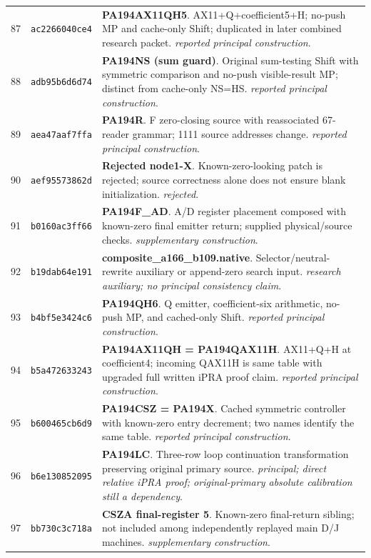 \begin{longtable}{@{}r p{} p{}@{}}
87 & \texttt{ac2266040ce4} & \textbf{PA194AX11QH5}. AX11+Q+coefficient5+H; no-push MP and cache-only Shift; duplicated in later combined research packet. \emph{reported principal construction}.\\[3pt]
88 & \texttt{adb95b6d6d74} & \textbf{PA194NS (sum guard)}. Original sum-testing Shift with symmetric comparison and no-push visible-result MP; distinct from cache-only NS=HS. \emph{reported principal construction}.\\[3pt]
89 & \texttt{aea47aaf7ffa} & \textbf{PA194R}. F zero-closing source with reassociated 67-reader grammar; 1111 source addresses change. \emph{reported principal construction}.\\[3pt]
90 & \texttt{aef95573862d} & \textbf{Rejected node1-X}. Known-zero-looking patch is rejected; source correctness alone does not ensure blank initialization. \emph{rejected}.\\[3pt]
91 & \texttt{b0160ac3ff66} & \textbf{PA194F\_AD}. A/D register placement composed with known-zero final emitter return; supplied physical/source checks. \emph{supplementary construction}.\\[3pt]
92 & \texttt{b19dab64e191} & \textbf{composite\_a166\_b109.native}. Selector/neutral-rewrite auxiliary or append-zero search input. \emph{research auxiliary; no principal consistency claim}.\\[3pt]
93 & \texttt{b4bf5e3424c6} & \textbf{PA194QH6}. Q emitter, coefficient-six arithmetic, no-push MP, and cached-only Shift. \emph{reported principal construction}.\\[3pt]
94 & \texttt{b5a472633243} & \textbf{PA194AX11QH = PA194QAX11H}. AX11+Q+H at coefficient4; incoming QAX11H is same table with upgraded full written iPRA proof claim. \emph{reported principal construction}.\\[3pt]
95 & \texttt{b600465cb6d9} & \textbf{PA194CSZ = PA194X}. Cached symmetric controller with known-zero entry decrement; two names identify the same table. \emph{reported principal construction}.\\[3pt]
96 & \texttt{b6e130852095} & \textbf{PA194LC}. Three-row loop continuation transformation preserving original primary source. \emph{principal; direct relative iPRA proof; original-primary absolute calibration still a dependency}.\\[3pt]
97 & \texttt{bb730c3c718a} & \textbf{CSZA final-register 5}. Known-zero final-return sibling; not included among independently replayed main D/J machines. \emph{supplementary construction}.\\[3pt]

\end{longtable}
